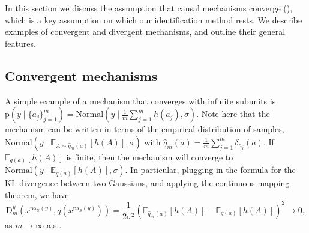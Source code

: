 \documentclass[12pt]{article}
\newcommand{\pa}{\mathrm{pa}}
\newcommand{\pr}{\mathrm{p}}
\begin{document}
In this section we discuss the assumption that causal mechanisms converge (), which is a key assumption on which our identification method rests. 
We describe examples of convergent and divergent mechanisms, and outline their general features.  

\subsection{Convergent mechanisms}
A simple example of a mechanism that converges with infinite subunits is $\pr(y \mid \{a_{j}\}_{j=1}^m) = \mathrm{Normal}(y \mid \frac{1}{m}\sum_{j=1}^m h(a_{j}), \sigma)$.
Note here that the mechanism can be written in terms of the empirical distribution of samples, $\mathrm{Normal}(y \mid \mathbb{E}_{A \sim \hat{q}_{m}(a)}[ h(A)], \sigma)$ with $\hat{q}_{m}(a) = \frac{1}{m} \sum_{j=1}^m \delta_{a_{j}}(a)$.
If $\mathbb{E}_{q(a)}[h(A)]$ is finite, then the mechanism will converge to $\mathrm{Normal}(y \mid \mathbb{E}_{q(a)}[h(A)], \sigma)$.
In particular, plugging in the formula for the KL divergence between two Gaussians, and applying the continuous mapping theorem, we have
\begin{equation}
	\mathrm{D}^{y}_m(x^{\pa_\mathcal{U}(y)}, q(x^{\pa_\mathcal{S}(y)})) = \frac{1}{2\sigma^2}(\mathbb{E}_{\hat{q}_m(a)}[h(A)] - \mathbb{E}_{q(a)}[h(A)])^2 \to 0,
\end{equation}
as $m \to \infty$ a.s..
\end{document}
